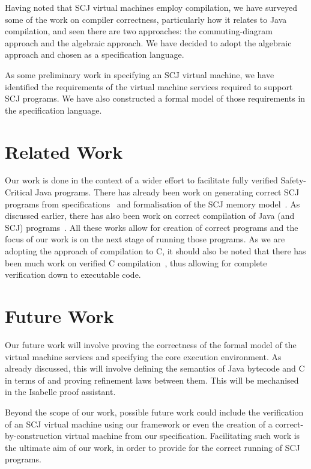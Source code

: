 \documentclass[a4paper,10pt]{report}
\begin{document}
Having noted that SCJ virtual machines employ compilation, we have surveyed some
of the work on compiler correctness, particularly how it relates to Java
compilation, and seen there are two approaches: the commuting-diagram approach
and the algebraic approach.  We have decided to adopt the algebraic approach and
chosen \Circus{} as a specification language.

As some preliminary work in specifying an SCJ virtual machine, we have
identified the requirements of the virtual machine services required to support
SCJ programs.  We have also constructed a formal model of those requirements in
the \Circus{} specification language.

\section{Related Work}
\label{related-work-section}

Our work is done in the context of a wider effort to facilitate fully verified
Safety-Critical Java programs.  There has already been work on generating
correct SCJ programs from \Circus{} specifications~\cite{cavalcanti2011,
  cavalcanti2013} and formalisation of the SCJ memory
model~\cite{cavalcanti2011a}.  As discussed earlier, there has also been work on
correct compilation of Java (and SCJ) programs~\cite{klein2006, strecker2002,
  lochbihler2010, duran2005, stark2001}.  All these works allow for creation of
correct programs and the focus of our work is on the next stage of running those
programs.  As we are adopting the approach of compilation to C, it should also
be noted that there has been much work on verified C
compilation~\cite{leroy2009a, leroy2009b, leroy2012, leinenbach2005, blazy2006},
thus allowing for complete verification down to executable code.

\section{Future Work}
\label{future-work-section}

Our future work will involve proving the correctness of the formal model of the
virtual machine services and specifying the core execution environment.  As
already discussed, this will involve defining the semantics of Java bytecode and
C in terms of \Circus{} and proving refinement laws between them.  This will be
mechanised in the Isabelle proof assistant.

Beyond the scope of our work, possible future work could include the
verification of an SCJ virtual machine using our framework or even the creation
of a correct-by-construction virtual machine from our specification.
Facilitating such work is the ultimate aim of our work, in order to provide for
the correct running of SCJ programs.

\raggedright
\printbibliography
\end{document}
